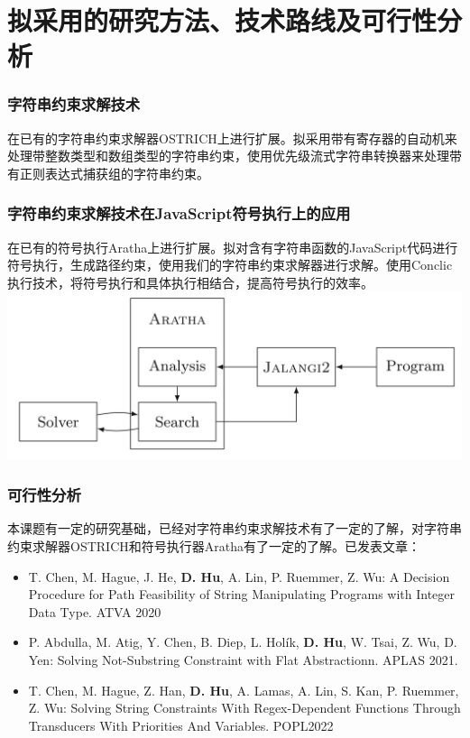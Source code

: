 \documentclass[landscape]{beamer}
\begin{document}
\section{拟采用的研究方法、技术路线及可行性分析}
\begin{frame}
  \frametitle{字符串约束求解技术}
  在已有的字符串约束求解器OSTRICH上进行扩展。拟采用带有寄存器的自动机来处理带整数类型和数组类型的字符串约束，使用优先级流式字符串转换器来处理带有正则表达式捕获组的字符串约束。
\end{frame}
\begin{frame}
  \frametitle{字符串约束求解技术在JavaScript符号执行上的应用}
  在已有的符号执行Aratha上进行扩展。拟对含有字符串函数的JavaScript代码进行符号执行，生成路径约束，使用我们的字符串约束求解器进行求解。使用Conclic执行技术，将符号执行和具体执行相结合，提高符号执行的效率。
  \includegraphics[width=\linewidth]{aratha}
\end{frame}
\begin{frame}
  \frametitle{可行性分析}
  本课题有一定的研究基础，已经对字符串约束求解技术有了一定的了解，对字符串约束求解器OSTRICH和符号执行器Aratha有了一定的了解。已发表文章：
  \begin{itemize}
    \item T. Chen, M. Hague, J. He, \textbf{D. Hu}, A. Lin, P. Ruemmer, Z. Wu: A Decision Procedure for Path Feasibility of String Manipulating Programs with Integer Data Type. ATVA 2020
    \item P. Abdulla, M. Atig, Y. Chen, B. Diep, L. Holík, \textbf{D. Hu}, W. Tsai, Z. Wu, D. Yen: Solving Not-Substring Constraint with Flat Abstractionn. APLAS 2021.
    \item T. Chen, M. Hague, Z. Han, \textbf{D. Hu}, A. Lamas, A. Lin, S. Kan, P. Ruemmer, Z. Wu: Solving String Constraints With Regex-Dependent Functions Through Transducers With Priorities And Variables. POPL2022
  \end{itemize}
\end{frame}
\end{document}
